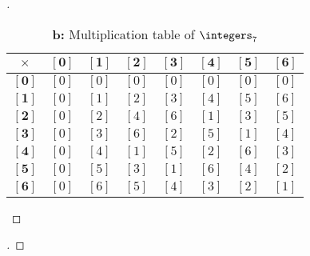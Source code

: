 \documentclass[paper=usletter, fontsize=12pt]{article}
\begin{document}
\begin{itemize}
\begin{itemize}
\begin{proof}[\unskip\nopunct]
                \begin{table}
                    \centering
                    \caption{\textbf{b:} Multiplication table of $\integers_7$}
                    \renewcommand{\arraystretch}{2.5}
                    \begin{tabular}{|c|c|c|c|c|c|c|c|}
\hline
$\bm{\times}$ & $\bm{[0]}$ & $\bm{[1]}$ & $\bm{[2]}$ & $\bm{[3]}$ & $\bm{[4]}$ & $\bm{[5]}$ & $\bm{[6]}$ \\
\hline
$\bm{[0]}$ & $[0]$ & $[0]$ & $[0]$ & $[0]$ & $[0]$ & $[0]$ & $[0]$ \\
\hline
$\bm{[1]}$ & $[0]$ & $[1]$ & $[2]$ & $[3]$ & $[4]$ & $[5]$ & $[6]$ \\
\hline
$\bm{[2]}$ & $[0]$ & $[2]$ & $[4]$ & $[6]$ & $[1]$ & $[3]$ & $[5]$ \\
\hline
$\bm{[3]}$ & $[0]$ & $[3]$ & $[6]$ & $[2]$ & $[5]$ & $[1]$ & $[4]$ \\
\hline
$\bm{[4]}$ & $[0]$ & $[4]$ & $[1]$ & $[5]$ & $[2]$ & $[6]$ & $[3]$ \\
\hline
$\bm{[5]}$ & $[0]$ & $[5]$ & $[3]$ & $[1]$ & $[6]$ & $[4]$ & $[2]$ \\
\hline
$\bm{[6]}$ & $[0]$ & $[6]$ & $[5]$ & $[4]$ & $[3]$ & $[2]$ & $[1]$ \\
\hline
                    \end{tabular}
                \end{table}

            \end{proof}

            \begin{proof}[\unskip\nopunct]


\end{proof}
\end{itemize}
\end{itemize}
\end{document}
